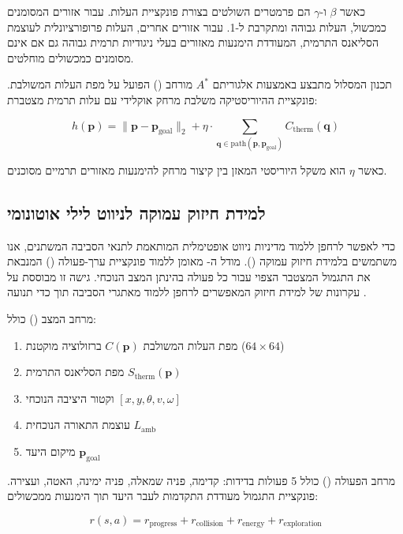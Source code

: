 כאשר $\beta$ ו-$\gamma$ הם פרמטרים השולטים בצורת פונקציית העלות. עבור אזורים המסומנים כמכשול, העלות גבוהה ומתקרבת ל-1. עבור אזורים אחרים, העלות פרופורציונלית לעוצמת הסליאנס התרמית, המעודדת הימנעות מאזורים בעלי ניגודיות תרמית גבוהה גם אם אינם מסומנים כמכשולים מוחלטים.

תכנון המסלול מתבצע באמצעות אלגוריתם $A^*$ מורחב () הפועל על מפת העלות המשולבת. פונקציית ההיוריסטיקה משלבת מרחק אוקלידי עם עלות תרמית מצטברת:

\begin{equation}
h(\mathbf{p}) = \| \mathbf{p} - \mathbf{p}_{\text{goal}} \|_2 + \eta \cdot \sum_{\mathbf{q} \in \text{path}(\mathbf{p}, \mathbf{p}_{\text{goal}})} C_{\text{therm}}(\mathbf{q})
\label{eq:ch06_heuristic}
\end{equation}

כאשר $\eta$ הוא משקל היוריסטי המאזן בין קיצור מרחק להימנעות מאזורים תרמיים מסוכנים.

\subsection{למידת חיזוק עמוקה לניווט לילי אוטונומי}
\label{sec:ch06_drl}

כדי לאפשר לרחפן ללמוד מדיניות ניווט אופטימלית המותאמת לתנאי הסביבה המשתנים, אנו משתמשים בלמידת חיזוק עמוקה (). מודל ה- מאומן ללמוד פונקציית ערך-פעולה () המנבאת את התגמול המצטבר הצפוי עבור כל פעולה בהינתן המצב הנוכחי. גישה זו מבוססת על עקרונות של למידת חיזוק המאפשרים לרחפן ללמוד מאתגרי הסביבה תוך כדי תנועה \cite{Thrun2005ProbRobotics}.

מרחב המצב () כולל:
\begin{enumerate}
  \item מפת העלות המשולבת $C(\mathbf{p})$ ברזולוציה מוקטנת ($64 \times 64$)
  \item מפת הסליאנס התרמית $S_{\text{therm}}(\mathbf{p})$
  \item וקטור היציבה הנוכחי $[x, y, \theta, v, \omega]$
  \item עוצמת התאורה הנוכחית $L_{\text{amb}}$
  \item מיקום היעד $\mathbf{p}_{\text{goal}}$
\end{enumerate}

מרחב הפעולה () כולל 5 פעולות בדידות: קדימה, פניה שמאלה, פניה ימינה, האטה, ועצירה. פונקציית התגמול מעודדת התקדמות לעבר היעד תוך הימנעות ממכשולים:

\begin{equation}
r(s, a) = r_{\text{progress}} + r_{\text{collision}} + r_{\text{energy}} + r_{\text{exploration}}
\label{eq:ch06_reward}
\end{equation}

